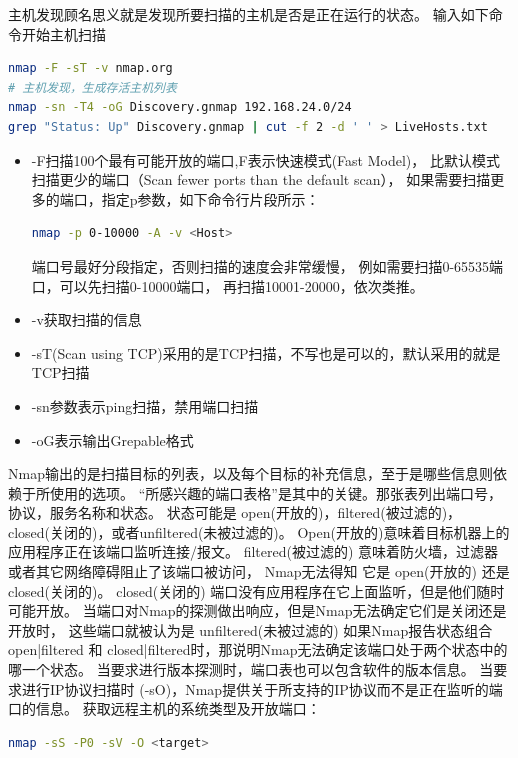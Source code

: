 \documentclass[12pt]{book}
\numberwithin{dummy}{section}
\theoremstyle{ocrenumbox}
\theoremstyle{blacknumex}
\theoremstyle{blacknumbox}
\theoremstyle{ocrenum}
\begin{document}
主机发现顾名思义就是发现所要扫描的主机是否是正在运行的状态。
输入如下命令开始主机扫描

\begin{lstlisting}[language=Bash]
nmap -F -sT -v nmap.org
# 主机发现，生成存活主机列表
nmap -sn -T4 -oG Discovery.gnmap 192.168.24.0/24
grep "Status: Up" Discovery.gnmap | cut -f 2 -d ' ' > LiveHosts.txt
\end{lstlisting}

\begin{itemize}
	\item{-F}扫描100个最有可能开放的端口,F表示快速模式(Fast Model)，
	比默认模式扫描更少的端口（Scan fewer ports than the default scan），
	如果需要扫描更多的端口，指定p参数，如下命令行片段所示：
	
\begin{lstlisting}[language=Bash]
nmap -p 0-10000 -A -v <Host>
\end{lstlisting}
	
	端口号最好分段指定，否则扫描的速度会非常缓慢，
	例如需要扫描0-65535端口，可以先扫描0-10000端口，
	再扫描10001-20000，依次类推。
	
	\item{-v}获取扫描的信息
	\item{-sT(Scan using TCP)}采用的是TCP扫描，不写也是可以的，默认采用的就是TCP扫描
	\item{-sn参数表示ping扫描，禁用端口扫描}
	\item{-oG表示输出Grepable格式}
\end{itemize}

Nmap输出的是扫描目标的列表，以及每个目标的补充信息，至于是哪些信息则依赖于所使用的选项。
“所感兴趣的端口表格”是其中的关键。那张表列出端口号，协议，服务名称和状态。
状态可能是 open(开放的)，filtered(被过滤的)， closed(关闭的)，或者unfiltered(未被过滤的)。
Open(开放的)意味着目标机器上的应用程序正在该端口监听连接/报文。 
filtered(被过滤的) 意味着防火墙，过滤器或者其它网络障碍阻止了该端口被访问，
Nmap无法得知 它是 open(开放的) 还是 closed(关闭的)。 
closed(关闭的) 端口没有应用程序在它上面监听，但是他们随时可能开放。 
当端口对Nmap的探测做出响应，但是Nmap无法确定它们是关闭还是开放时，
这些端口就被认为是 unfiltered(未被过滤的) 如果Nmap报告状态组合 
open|filtered 和 closed|filtered时，那说明Nmap无法确定该端口处于两个状态中的哪一个状态。
当要求进行版本探测时，端口表也可以包含软件的版本信息。
当要求进行IP协议扫描时 (-sO)，Nmap提供关于所支持的IP协议而不是正在监听的端口的信息。
获取远程主机的系统类型及开放端口：

\begin{lstlisting}[language=Bash]
nmap -sS -P0 -sV -O <target>
\end{lstlisting}
\end{document}
